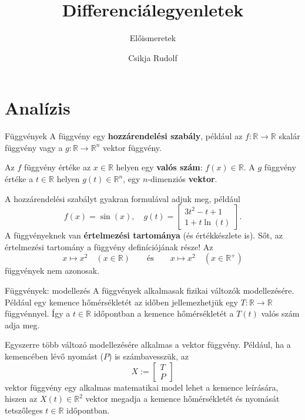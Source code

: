 \documentclass[10pt]{beamer}
\title{Differenciálegyenletek}
\subtitle{Előismeretek}
\date{}
\author{Csikja Rudolf}
\institute{Budapesti Műszaki és Gazdaságtudományi Egyetem\\Matemaikai Intézet, Analízis Tanszék}
\renewcommand{\emph}[1]{{\bf #1}}
\newcommand{\R}[0]{\mathbb{R}}
\begin{document}
\maketitle



\section{Analízis}
\begin{frame}[t]{Függvények}
A függvény egy \emph{hozzárendelési szabály}, például az
$f\colon\R\to\R$ skalár függvény vagy a $g\colon\R\to\R^n$ vektor függvény.

Az $f$ függvény értéke az $x\in\R$ helyen egy \emph{valós szám}: $f(x)\in\R.$
A $g$ függvény értéke a $t\in\R$ helyen $g(t)\in\R^n$, egy $n$-dimenziós \emph{vektor}.

A hozzárendelési szabályt gyakran formulával adjuk meg, például
\[f(x) = \sin(x), \quad g(t) = \begin{bmatrix}3t^2 - t + 1\\ 1 + t\ln(t)\end{bmatrix}.\]
A függvényeknek van \emph{értelmezési tartománya} (és értékkészlete is).
Sőt, az értelmezési tartomány a függvény definíciójának része!
Az
\[x\mapsto x^2 \quad (x\in\R) \qquad \text{és} \qquad x \mapsto x^2\quad (x\in\R^+)\]
függvények nem azonosak.
\end{frame}

\begin{frame}[t]{Függvények: modellezés}
A függvények alkalmasak fizikai változók modellezésére.
Például egy kemence hőmérsékletét az időben jellemezhetjük
egy $T\colon \R \to \R$ függvénnyel.
Így a $t\in\R$ időpontban a kemence hőmérsékletét
a $T(t)$ valós szám adja meg.

Egyszerre több változó modellezésére alkalmas a vektor függvény.
Például, ha a kemencében lévő nyomást ($P$) is számbavesszük, az
\[X:=\begin{bmatrix}T \\ P\end{bmatrix}\]
vektor függvény egy alkalmas matematikai model lehet a kemence leírására,
hiszen az $X(t)\in\R^2$ vektor megadja a kemence hőmérsékletét és nyomását tetszőleges $t\in\R$ időpontban.
\end{frame}
\end{document}
